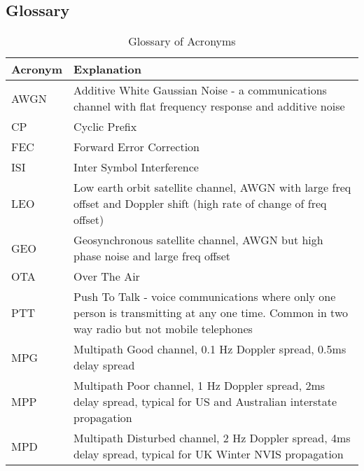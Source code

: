 \documentclass{article}
\begin{document}
\clearpage

\subsection{Glossary}

\begin{table}[h]
\centering
\begin{tabular}{l p{8cm} }
 \hline
 Acronym & Explanation \\
 \hline
 AWGN & Additive White Gaussian Noise - a communications channel with flat frequency response and additive noise \\
 CP & Cyclic Prefix \\
 FEC & Forward Error Correction \\
 ISI & Inter Symbol Interference \\
 LEO & Low earth orbit satellite channel, AWGN with large freq offset and Doppler shift (high rate of change of freq offset) \\
 GEO & Geosynchronous satellite channel, AWGN but high phase noise and large freq offset \\
 OTA & Over The Air \\
 PTT & Push To Talk - voice communications where only one person is transmitting at any one time.  Common in two way radio but not mobile telephones  \\
 MPG & Multipath Good channel, 0.1 Hz Doppler spread, 0.5ms delay spread \\
 MPP & Multipath Poor channel, 1 Hz Doppler spread, 2ms delay spread, typical for US and Australian interstate propagation \\
 MPD & Multipath Disturbed channel, 2 Hz Doppler spread, 4ms delay spread, typical for UK Winter NVIS propagation \\
 \hline
\end{tabular}
\caption{Glossary of Acronyms}
\end{table}
\end{document}
